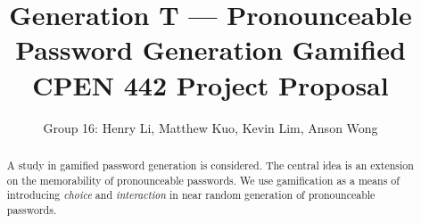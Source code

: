 \documentclass[conference]{IEEEtran}
\begin{document}
\title{Generation T --- Pronounceable Password Generation Gamified\\
CPEN 442 Project Proposal}


\author{Group 16: Henry Li, Matthew Kuo, Kevin Lim, Anson Wong}


\maketitle

\begin{abstract}
A study in gamified password generation is considered. The central idea is an extension on the memorability of pronounceable passwords. We use gamification as a means of introducing \emph{choice} and \emph{interaction} in near random generation of pronounceable passwords.
\end{abstract}
\end{document}
